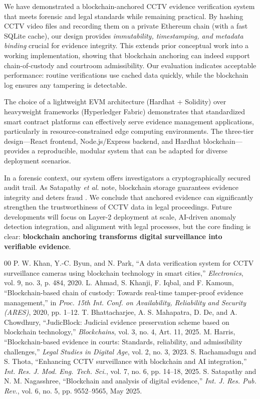 \documentclass[conference]{IEEEtran}
\begin{document}
We have demonstrated a blockchain-anchored CCTV evidence verification system that meets forensic and legal standards while remaining practical. By hashing CCTV video files and recording them on a private Ethereum chain (with a fast SQLite cache), our design provides \textit{immutability, timestamping, and metadata binding} crucial for evidence integrity. This extends prior conceptual work into a working implementation, showing that blockchain anchoring can indeed support chain-of-custody and courtroom admissibility. Our evaluation indicates acceptable performance: routine verifications use cached data quickly, while the blockchain log ensures any tampering is detectable.

The choice of a lightweight EVM architecture (Hardhat + Solidity) over heavyweight frameworks (Hyperledger Fabric) demonstrates that standardized smart contract platforms can effectively serve evidence management applications, particularly in resource-constrained edge computing environments. The three-tier design---React frontend, Node.js/Express backend, and Hardhat blockchain---provides a reproducible, modular system that can be adapted for diverse deployment scenarios.

In a forensic context, our system offers investigators a cryptographically secured audit trail. As Satapathy \textit{et al.} note, blockchain storage guarantees evidence integrity and deters fraud \cite{b6}. We conclude that anchored evidence can significantly strengthen the trustworthiness of CCTV data in legal proceedings. Future developments will focus on Layer-2 deployment at scale, AI-driven anomaly detection integration, and alignment with legal processes, but the core finding is clear: \textbf{blockchain anchoring transforms digital surveillance into verifiable evidence}.

\begin{thebibliography}{00}
 P. W. Khan, Y.-C. Byun, and N. Park, ``A data verification system for CCTV surveillance cameras using blockchain technology in smart cities,'' \textit{Electronics}, vol. 9, no. 3, p. 484, 2020.
 L. Ahmad, S. Khanji, F. Iqbal, and F. Kamoun, ``Blockchain-based chain of custody: Towards real-time tamper-proof evidence management,'' in \textit{Proc. 15th Int. Conf. on Availability, Reliability and Security (ARES)}, 2020, pp. 1--12.
 T. Bhattacharjee, A. S. Mahapatra, D. De, and A. Chowdhury, ``JudicBlock: Judicial evidence preservation scheme based on blockchain technology,'' \textit{Blockchains}, vol. 3, no. 4, Art. 11, 2025.
 M. Harris, ``Blockchain-based evidence in courts: Standards, reliability, and admissibility challenges,'' \textit{Legal Studies in Digital Age}, vol. 2, no. 3, 2023.
 S. Rachamadugu and S. Thota, ``Enhancing CCTV surveillance with blockchain and AI integration,'' \textit{Int. Res. J. Mod. Eng. Tech. Sci.}, vol. 7, no. 6, pp. 14--18, 2025.
 S. Satapathy and N. M. Nagasshree, ``Blockchain and analysis of digital evidence,'' \textit{Int. J. Res. Pub. Rev.}, vol. 6, no. 5, pp. 9552--9565, May 2025.
\end{thebibliography}
\end{document}
